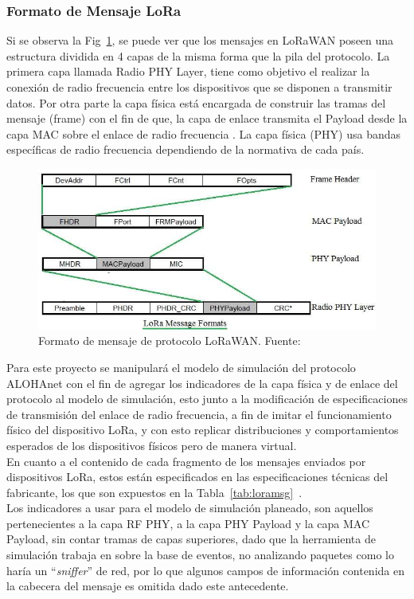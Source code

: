 \begin{justify}
\subsubsection{Formato de Mensaje LoRa}
Si se observa la Fig~\ref{fig:msg}, se puede ver que los mensajes en LoRaWAN poseen una estructura dividida en 4 capas de la misma forma que la pila del protocolo. La primera capa llamada Radio PHY Layer, tiene como objetivo el realizar la conexión de radio frecuencia entre los dispositivos que se disponen a transmitir datos. Por otra parte la capa física está encargada de construir las tramas del mensaje (frame) con el fin de que, la capa de enlace transmita el Payload desde la capa MAC sobre el enlace de radio frecuencia . La capa física (PHY) usa bandas específicas de radio frecuencia dependiendo de la normativa de cada país\cite{Sornin}.\\
\begin{figure}[!ht]
\includegraphics[scale=0.5]{images/LoRa-message-formats}
\caption{Formato de mensaje de protocolo LoRaWAN. Fuente:~\cite{Sornin}}
\label{fig:msg}
\end{figure}
\noindent
Para este proyecto se manipulará el modelo de simulación del protocolo ALOHAnet con el fin de agregar los indicadores de la capa física y de enlace del protocolo al modelo de simulación, esto junto a la modificación de especificaciones de transmisión del enlace de radio frecuencia, a fin de imitar el funcionamiento físico del dispositivo LoRa, y con esto replicar distribuciones y comportamientos esperados de los dispositivos físicos pero de manera virtual.\\
En cuanto a el contenido de cada fragmento de los mensajes enviados por dispositivos LoRa, estos están especificados en las especificaciones técnicas del fabricante, los que son expuestos en la Tabla~\ref{tab:loramsg}~\cite{Sornin}.\\
Los indicadores a usar para el modelo de simulación planeado, son aquellos pertenecientes a la capa RF PHY, a la capa PHY Payload y la capa MAC Payload, sin contar tramas de capas superiores, dado que la herramienta de simulación trabaja en sobre la base de eventos, no analizando paquetes como lo haría un ``\textit{sniffer}'' de red, por lo que algunos campos de información contenida en la cabecera del mensaje es omitida dado este antecedente.

\end{justify}
